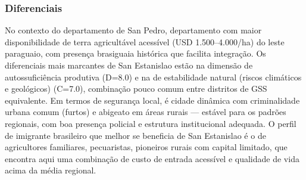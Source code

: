 \subsubsection*{Diferenciais}\label{dif-san-estanislao-0208}
No contexto do departamento de San Pedro, departamento com maior disponibilidade de terra agricultável acessível (USD 1.500–4.000/ha) do leste paraguaio, com presença brasiguaia histórica que facilita integração. Os diferenciais mais marcantes de San Estanislao estão na dimensão de autossuficiência produtiva (D=8.0) e na de estabilidade natural (riscos climáticos e geológicos) (C=7.0), combinação pouco comum entre distritos de GSS equivalente. Em termos de segurança local, é cidade dinâmica com criminalidade urbana comum (furtos) e abigeato em áreas rurais — estável para os padrões regionais, com boa presença policial e estrutura institucional adequada. O perfil de imigrante brasileiro que melhor se beneficia de San Estanislao é o de agricultores familiares, pecuaristas, pioneiros rurais com capital limitado, que encontra aqui uma combinação de custo de entrada acessível e qualidade de vida acima da média regional.
